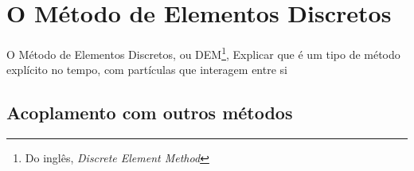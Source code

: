 \chapter{O Método de Elementos Discretos} \label{ch:discrete_element_method}

O Método de Elementos Discretos, ou DEM\footnote{Do inglês, \textit{Discrete Element Method}}, \alert{Explicar que é um tipo de método explícito no tempo, com partículas que interagem entre si}

\section{}

\section{Acoplamento com outros métodos}